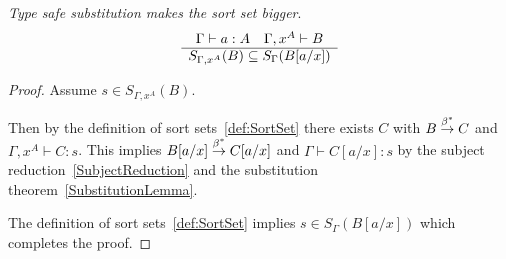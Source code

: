 \begin{theorem}
    \label{thm:SortSetSubstitution}
    \emph{Type safe substitution makes the sort set bigger}.
    $$
        \begin{array}{c} 
            \Gamma \vdash a : A \quad \Gamma,x^A \vdash B
         \\ \hline 
            S_{\Gamma,x^A}(B) \subseteq S_\Gamma(B[a/x])
        \end{array}
    $$
    \begin{proof}
        Assume $s \in S_{\Gamma,x^A}(B)$.

        Then by the definition of sort sets~\ref{def:SortSet}
        there exists $C$ with $B \stackrel{\beta^*}{\to} C$ and $\Gamma,x^A \vdash C: s$.
        This implies $B[a/x] \stackrel{\beta^*}{\to} C[a/x]$ and $\Gamma \vdash C[a/x] : s$
        by the subject reduction~\ref{SubjectReduction} and the substitution
        theorem~\ref{SubstitutionLemma}.

        The definition of sort sets~\ref{def:SortSet} implies $s \in
        S_\Gamma(B[a/x])$ which completes the proof.
    \end{proof}
\end{theorem}






